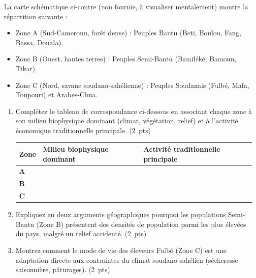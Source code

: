\documentclass[11pt]{article}
\begin{document}
\begin{exercice}
\label{exo:groupes}
La carte schématique ci-contre (non fournie, à visualiser mentalement) montre la répartition suivante : 
\begin{itemize}
    \item Zone A (Sud-Cameroun, forêt dense) : Peuples Bantu (Beti, Boulou, Fang, Bassa, Douala).
    \item Zone B (Ouest, hautes terres) : Peuples Semi-Bantu (Bamiléké, Bamoun, Tikar).
    \item Zone C (Nord, savane soudano-sahélienne) : Peuples Soudanais (Fulbé, Mafa, Toupouri) et Arabes-Chua.
\end{itemize}

\begin{enumerate}
    \item Complétez le tableau de correspondance ci-dessous en associant chaque zone à son milieu biophysique dominant (climat, végétation, relief) et à l'activité économique traditionnelle principale. (2~pts)
    
    \begin{tabularx}{\linewidth}{>{\bfseries}X>{\centering}X>{\centering\arraybackslash}X}
    \toprule
    Zone & Milieu biophysique dominant & Activité traditionnelle principale \\
    \midrule
    A & & \\
    B & & \\
    C & & \\
    \bottomrule
    \end{tabularx}
    
    \item Expliquez en deux arguments géographiques pourquoi les populations Semi-Bantu (Zone B) présentent des densités de population parmi les plus élevées du pays, malgré un relief accidenté. (2~pts)
    \item Montrez comment le mode de vie des éleveurs Fulbé (Zone C) est une adaptation directe aux contraintes du climat soudano-sahélien (sécheresse saisonnière, pâturages). (2~pts)
\end{enumerate}
\end{exercice}
\end{document}
